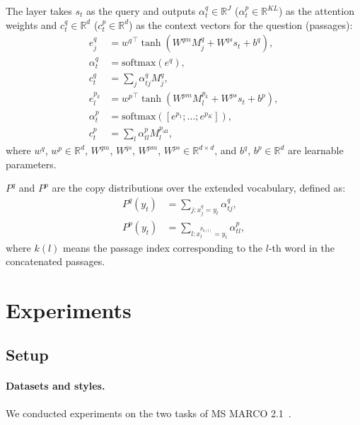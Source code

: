 \documentclass[11pt,a4paper]{article}
\theoremstyle{mydef}
\theoremstyle{myprob}
\begin{document}
The layer takes $s_t$ as the query and outputs $\alpha^q_t \in \mathbb{R}^J$ ($\alpha^p_t \in \mathbb{R}^{KL}$) as the attention weights and $c^q_t \in \mathbb{R}^d$ ($c^p_t \in \mathbb{R}^d$) as the context vectors for the question (passages):
\begin{align}
e^q_j &= {w^q}^\top \tanh(W^{qm} M_j^q + W^{qs} s_t +b^q), \\
\alpha^q_t &= \mathrm{softmax}(e^q), \\ 
c^q_t &= \textstyle \sum_j \alpha^q_{tj} M_j^q, \\
e^{p_k}_l &= {w^p}^\top \tanh(W^{pm} M_l^{p_k} + W^{ps} s_t +b^p), \\
\alpha^p_t &= \mathrm{softmax}([e^{p_1}; \ldots; e^{p_K}]), \\
c^p_t &=  \textstyle \sum_{l} \alpha^p_{tl} M^{p_\mathrm{all}}_{l}, 
\end{align}
where $w^q$, $w^p \in \mathbb{R}^d$, 
$W^{qm}$, $W^{qs}$, $W^{pm}$, $W^{ps}  \in \mathbb{R}^{d \times d}$, and $b^q$, $b^p \in \mathbb{R}^d$ are learnable parameters.

$P^q$ and $P^p$ are the copy distributions over the extended vocabulary, defined as:
\begin{align}
P^q(y_t) &=  \textstyle \sum_{j: x^q_j = y_t} \alpha^q_{tj}, \\
P^p(y_t) &= \textstyle \sum_{l: x^{p_{k(l)}}_{l} = y_t} \alpha^p_{tl},
\end{align}
where $k(l)$ means the passage index corresponding to the $l$-th word in the concatenated passages.



\section{Experiments}

\subsection{Setup}


\paragraph{Datasets and styles.}
We conducted experiments on the two tasks
of MS MARCO 2.1~\citep{Bajaj18}.
\end{document}
